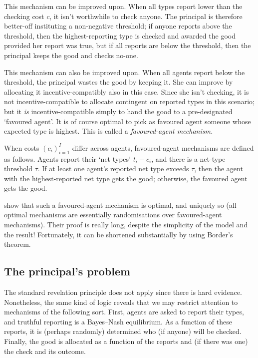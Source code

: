 This mechanism can be improved upon.
When all types report lower than the checking cost $c$, it isn't worthwhile to check anyone.
The principal is therefore better-off instituting a non-negative threshold;
if anyone reports above the threshold, then the highest-reporting type is checked and awarded the good provided her report was true,
but if all reports are below the threshold, then the principal keeps the good and checks no-one.

This mechanism can also be improved upon.
When all agents report below the threshold, the principal wastes the good by keeping it. She can improve by allocating it incentive-compatibly also in this case.
Since she isn't checking, it is not incentive-compatible to allocate contingent on reported types in this scenario; but it \emph{is} incentive-compatible simply to hand the good to a pre-designated `favoured agent'.
It is of course optimal to pick as favoured agent someone whose expected type is highest.
This is called a \emph{favoured-agent mechanism.}

When costs $(c_i)_{i=1}^I$ differ across agents, favoured-agent mechanisms are defined as follows.
Agents report their `net types' $t_i-c_i$,
and there is a net-type threshold $\tau$.
If at least one agent's reported net type exceeds $\tau$,
then the agent with the highest-reported net type gets the good;
otherwise, the favoured agent gets the good.

\textcite{BenporathDekelLipman2014} show that such a favoured-agent mechanism is optimal,
and uniquely so (all optimal mechanisms are essentially randomisations over favoured-agent mechanisms).
Their proof is really long, despite the simplicity of the model and the result!
Fortunately, it can be shortened substantially by using Border's theorem.



\subsection{The principal's problem}
\label{sec:ch2:bdl14:first}

The standard revelation principle does not apply since there is hard evidence.
Nonetheless, the same kind of logic reveals that we may restrict attention to mechanisms of the following sort. First, agents are asked to report their types, and truthful reporting is a Bayes--Nash equilibrium.
As a function of these reports, it is (perhaps randomly) determined who (if anyone) will be checked.
Finally, the good is allocated as a function of the reports and (if there was one) the check and its outcome.


